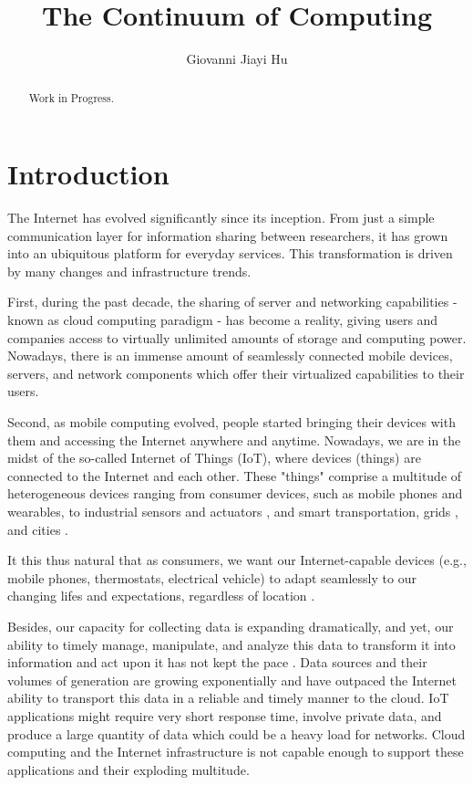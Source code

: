 \documentclass{ieeeaccess}
\begin{document}

\title{The Continuum of Computing}
\author{Giovanni Jiayi Hu}
\address[1]{Department of Mathematics, University of Padua, Italy I-35121}

\begin{abstract}
Work in Progress.
\end{abstract}

\titlepgskip=-15pt

\maketitle

\section{Introduction}
\label{sec:introduction}

The Internet has evolved significantly since its inception. From just a simple communication layer for information sharing between researchers, it has grown into an ubiquitous platform for everyday services. This transformation is driven by many changes and infrastructure trends.

First, during the past decade, the sharing of server and networking capabilities - known as cloud computing paradigm - has become a reality, giving users and companies access to virtually unlimited amounts of storage and computing power. Nowadays, there is an immense amount of seamlessly connected mobile devices, servers, and network components which offer their virtualized capabilities to their users.

Second, as mobile computing evolved, people started bringing their devices with them and accessing the Internet anywhere and anytime. Nowadays, we are in the midst of the so-called Internet of Things (IoT), where devices (things) are connected to the Internet and each other. These "things" comprise a multitude of heterogeneous devices ranging from consumer devices, such as mobile phones and wearables, to industrial sensors and actuators \cite{iot-manifacturing}, and smart transportation, grids \cite{dsu}, and cities \cite{saaas}.

It this thus natural that as consumers, we want our Internet-capable devices (e.g., mobile phones, thermostats, electrical vehicle) to adapt seamlessly to our changing lifes and expectations, regardless of location \cite{harnessing-continuum}.

Besides, our capacity for collecting data is expanding dramatically, and yet, our ability to timely manage, manipulate, and analyze this data to transform it into information and act upon it has not kept the pace \cite{computing-in-continuum}. Data sources and their volumes of generation are growing exponentially and have outpaced the Internet ability to transport this data in a reliable and timely manner to the cloud. IoT applications might require very short response time, involve private data, and produce a large quantity of data which could be a heavy load for networks. Cloud computing and the Internet infrastructure is not capable enough to support these applications and their exploding multitude.
\end{document}
